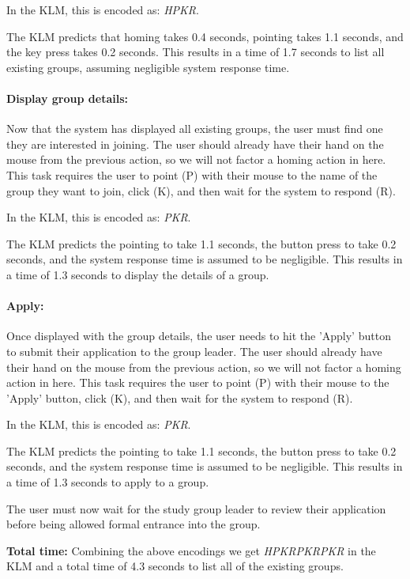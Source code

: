 \documentclass[conference]{IEEEtran}
\begin{document}
In the KLM, this is encoded as: \emph{HPKR}.

The KLM predicts that homing takes 0.4 seconds, pointing takes 1.1 seconds, and the key press takes 0.2 seconds.
This results in a time of 1.7 seconds to list all existing groups, assuming negligible system response time.

\paragraph{Display group details:}
Now that the system has displayed all existing groups, the user must find one they are interested in joining.
The user should already have their hand on the mouse from the previous action, so we will not factor a homing action in here.
This task requires the user to point (P) with their mouse to the name of the group they want to join, click (K), and then wait for the system to respond (R).

In the KLM, this is encoded as: \emph{PKR}.

The KLM predicts the pointing to take 1.1 seconds, the button press to take 0.2 seconds, and the system response time is assumed to be negligible.
This results in a time of 1.3 seconds to display the details of a group.

\paragraph{Apply:}
Once displayed with the group details, the user needs to hit the 'Apply' button to submit their application to the group leader.
The user should already have their hand on the mouse from the previous action, so we will not factor a homing action in here.
This task requires the user to point (P) with their mouse to the 'Apply' button, click (K), and then wait for the system to respond (R).

In the KLM, this is encoded as: \emph{PKR}.

The KLM predicts the pointing to take 1.1 seconds, the button press to take 0.2 seconds, and the system response time is assumed to be negligible.
This results in a time of 1.3 seconds to apply to a group.

The user must now wait for the study group leader to review their application before being allowed formal entrance into the group.

\textbf{Total time:}
Combining the above encodings we get \emph{HPKRPKRPKR} in the KLM and a total time of 4.3 seconds to list all of the existing groups.
\end{document}

